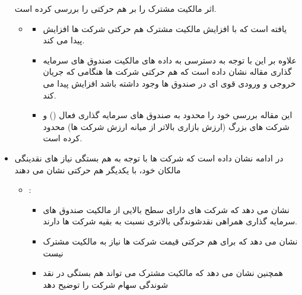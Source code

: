 \documentclass[12pt, a4paper]{article}
\begin{document}
\begin{itemize}
{  


}
  
 
 
 
 
 
 
اثر مالکیت مشترک را بر هم حرکتی را بررسی کرده است.  

\begin{itemize}
\item {}
\begin{itemize}
\item
یافته است که با افزایش مالکیت مشترک هم حرکتی شرکت ها افزایش پیدا می کند. 
\item
علاوه بر این با توجه به دسترسی به داده های مالکیت صندوق های سرمایه گذاری مقاله نشان داده است که هم حرکتی شرکت ها هنگامی که جریان خروجی و ورودی قوی ای در صندوق ها وجود داشته باشد افزایش پیدا می کند. 
\item
این مقاله بررسی خود را محدود به صندوق های سرمایه گذاری فعال 
() 
و شرکت های بزرگ (ارزش بازاری بالاتر از میانه ارزش شرکت ها) محدود کرده است.
\end{itemize}
\end{itemize}
\item
در ادامه 
نشان داده است که شرکت ها با توجه به هم بستگی نیاز های نقدینگی مالکان خود، با یکدیگر هم حرکتی نشان می دهند
\begin{itemize}
\item {}:
\begin{itemize} 
\item
 نشان می دهد که شرکت های دارای سطح بالایی از مالکیت صندوق های سرمایه گذاری همراهی نقدشوندگی بالاتری نسبت به بقیه شرکت ها دارند.
 \item
 نشان می دهد که برای هم حرکتی قیمت شرکت ها نیاز به مالکیت مشترک نیست
 \item
 همچنین نشان می دهد که مالکیت مشترک می تواند هم بستگی در نقد شوندگی سهام شرکت را توضیح دهد
\end{itemize}
\end{itemize}


\end{itemize}
\end{document}
